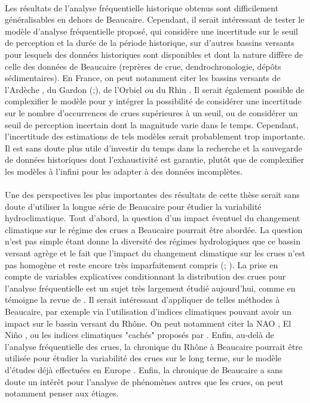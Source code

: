	\paragraph{} Les résultats de l'analyse fréquentielle historique obtenus sont difficilement généralisables en dehors de Beaucaire. Cependant, il serait intéressant de tester le modèle d'analyse fréquentielle proposé, qui considère une incertitude sur le seuil de perception et la durée de la période historique, sur d'autres bassins versants pour lesquels des données historiques sont disponibles et dont la nature diffère de celle des données de Beaucaire (reprères de crue, dendrochronologie, dépôts sédimentaires). En France, on peut notamment citer les bassins versants de l'Ardèche \citep{naulet_flood_2005} , du Gardon (\cite{neppel_flood_2010};\cite{dezileau_multidating_2014}), de l'Orbiel \citep{payrastre_usefulness_2011} ou du Rhin \citep{lang_evaluation_2022}. Il serait également possible de complexifier le modèle pour y intégrer la possibilité de considérer une incertitude sur le nombre d'occurrences de crues supérieures à un seuil, ou de considérer un seuil de perception incertain dont la magnitude varie dans le temps. Cependant, l'incertitude des estimations de tels modèles serait probablement trop importante. Il est sans doute plus utile d'investir du temps dans la recherche et la sauvegarde de données historiques dont l'exhaustivité est garantie, plutôt que de complexifier les modèles à l'infini pour les adapter à des données incomplètes. 
			
	\paragraph{} Une des perspectives les plus importantes des résultats de cette thèse serait sans doute d'utiliser la longue série de Beaucaire pour étudier la variabilité hydroclimatique. Tout d'abord, la question d'un impact éventuel du changement climatique sur le régime des crues a Beaucaire pourrait être abordée. La question n'est pas simple étant donne la diversité des régimes hydrologiques que ce bassin versant agrège et le fait que l'impact du changement climatique sur les crues n'est pas homogène et reste encore très imparfaitement compris (\cite{leblois_evaluation_2002}; \cite{giuntoli_floods_2019}). La prise en compte de variables explicatives conditionnant la distribution des crues pour l'analyse fréquentielle est un sujet très largement étudié aujourd'hui, comme en témoigne la revue de \citet{salas_techniques_2018}. Il serait intéressant d'appliquer de telles méthodes à Beaucaire, par exemple via l'utilisation d'indices climatiques pouvant avoir un impact sur le bassin versant du Rhône. On peut notamment citer la NAO \citep{criado-aldeanueva_climatic_2020}, El Niño \citep{bronnimann_impact_2007}, ou les indices climatiques "cachés" proposés par \citet{renard_hidden_2021}. Enfin, au-delà de l'analyse fréquentielle des crues, la chronique du Rhône à Beaucaire pourrait être utilisée pour étudier la variabilité des crues sur le long terme, sur le modèle d'études déjà effectuées en Europe \citep{bloschl_current_2020}. Enfin, la chronique de Beaucaire a sans doute un intérêt pour l'analyse de phénomènes autres que les crues, on peut notamment penser aux étiages.
	
